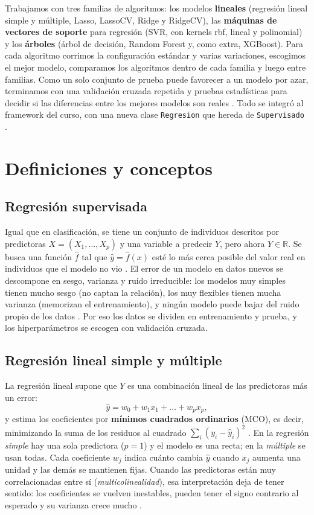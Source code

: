 \documentclass[11pt,a4paper]{article}
\let\citepOriginal\citep
\renewcommand*{\citep}[1]{\textbf{\citepOriginal{#1}}}%
\begin{document}
Trabajamos con tres familias de algoritmos: los modelos \textbf{lineales} (regresión lineal simple y múltiple, Lasso, LassoCV, Ridge y RidgeCV), las \textbf{máquinas de vectores de soporte} para regresión (SVR, con kernels rbf, lineal y polinomial) y los \textbf{árboles} (árbol de decisión, Random Forest y, como extra, XGBoost). Para cada algoritmo corrimos la configuración estándar y varias variaciones, escogimos el mejor modelo, comparamos los algoritmos dentro de cada familia y luego entre familias. Como un solo conjunto de prueba puede favorecer a un modelo por azar, terminamos con una validación cruzada repetida y pruebas estadísticas para decidir si las diferencias entre los mejores modelos son reales \citep{demsar2006}. Todo se integró al framework del curso, con una nueva clase \texttt{Regresion} que hereda de \texttt{Supervisado} \citep{pedregosa2011}.

\section{Definiciones y conceptos}

\subsection{Regresión supervisada}
Igual que en clasificación, se tiene un conjunto de individuos descritos por predictoras $X=(X_1,\dots,X_p)$ y una variable a predecir $Y$, pero ahora $Y\in\mathbb{R}$. Se busca una función $\hat f$ tal que $\hat y=\hat f(x)$ esté lo más cerca posible del valor real en individuos que el modelo no vio \citep{james2013}. El error de un modelo en datos nuevos se descompone en sesgo, varianza y ruido irreducible: los modelos muy simples tienen mucho sesgo (no captan la relación), los muy flexibles tienen mucha varianza (memorizan el entrenamiento), y ningún modelo puede bajar del ruido propio de los datos \citep{hastie2009}. Por eso los datos se dividen en entrenamiento y prueba, y los hiperparámetros se escogen con validación cruzada.

\subsection{Regresión lineal simple y múltiple}
La regresión lineal supone que $Y$ es una combinación lineal de las predictoras más un error:
\[
\hat y = w_0 + w_1x_1+\dots+w_px_p ,
\]
y estima los coeficientes por \textbf{mínimos cuadrados ordinarios} (MCO), es decir, minimizando la suma de los residuos al cuadrado $\sum_i (y_i-\hat y_i)^2$ \citep{james2013}. En la regresión \textit{simple} hay una sola predictora ($p=1$) y el modelo es una recta; en la \textit{múltiple} se usan todas. Cada coeficiente $w_j$ indica cuánto cambia $\hat y$ cuando $x_j$ aumenta una unidad y las demás se mantienen fijas. Cuando las predictoras están muy correlacionadas entre sí (\textit{multicolinealidad}), esa interpretación deja de tener sentido: los coeficientes se vuelven inestables, pueden tener el signo contrario al esperado y su varianza crece mucho \citep{dormann2013}.
\end{document}
